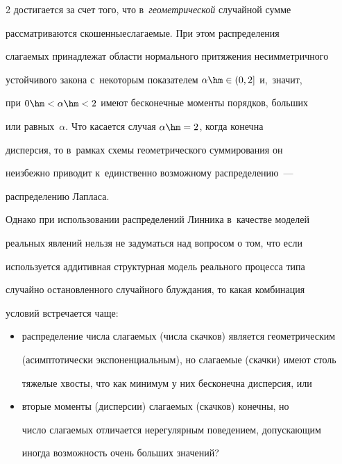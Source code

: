 \begin{multicols}{2}
достигается за счет того, что в~\textit{геометрической} случайной сумме


рассматриваются скошенные\linebreak слагаемые. При этом распределения


слагаемых принадлежат области нормального притяжения несимметричного


устойчивого закона с~некоторым показателем $\alpha\hm\in(0,2]$ и,~значит, 


при $0\hm<\alpha\hm<2$ имеют бесконечные моменты порядков, больших


или равных~$\alpha$. Что касается случая $\alpha\hm=2$, когда конечна


дисперсия, то в~рамках схемы гео\-мет\-ри\-че\-ско\-го суммирования он


неизбежно приводит к~единственно возможному распределению~---


распределению Лап\-ласа.





Однако при использовании распределений Линника в~качестве моделей


реальных явлений нельзя не задуматься над вопросом о том, что если


используется аддитивная структурная модель реального процесса типа


случайно остановленного случайного блуждания, то какая комбинация


условий встречается чаще:


\begin{itemize}


\item распределение числа слагаемых (числа скачков) является геометрическим


(асимптотически экспоненциальным), но слагаемые \mbox{(скачки)} имеют столь


тяжелые хвосты, что как минимум у них бесконечна дисперсия, или





\item вторые моменты (дисперсии) слагаемых (скачков) конечны, но


число слагаемых отличается нерегулярным поведением, допускающим


иногда возможность очень больших значений?


\end{itemize}






\end{multicols}
